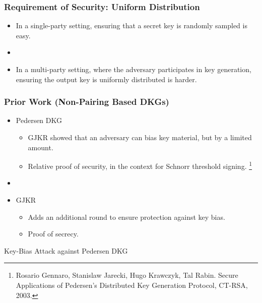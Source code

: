 \documentclass[hyperref={pdfpagelabels=true},table,dvipsnames,14pt,aspectratio=169]{beamer}
\begin{document}
\begin{frame}
  \frametitle{Requirement of Security: Uniform Distribution}

  \begin{itemize}
    \item<1-> In a single-party setting, ensuring that a secret key is randomly sampled is easy.
    \item[]
    \item<2-> In a multi-party setting, where the adversary participates in key generation,
      ensuring the output key is uniformly distributed is harder.
  \end{itemize}
\end{frame}


\begin{frame}
  \frametitle{Prior Work (Non-Pairing Based DKGs)}

  \begin{itemize}
    \item<1-> Pedersen DKG
  \begin{itemize}
      \item<2-> GJKR showed that an adversary can bias key material, but by a limited amount.
      \item<3-> Relative proof of security, in the context for Schnorr threshold signing.
  \footnote{
  Rosario Gennaro, Stanislaw Jarecki, Hugo Krawczyk, Tal Rabin.
  Secure Applications of Pedersen's Distributed Key Generation Protocol,
  CT-RSA, 2003.}
  \end{itemize}
    \item[]
    \item<4-> GJKR
  \begin{itemize}
      \item<5-> Adds an additional round to ensure protection against key bias.
      \item<6-> Proof of secrecy.
  \end{itemize}
  \end{itemize}
\end{frame}



\begin{frame}
  \huge
  \centering
  Key-Bias Attack against Pedersen DKG
\end{frame}
\end{document}
